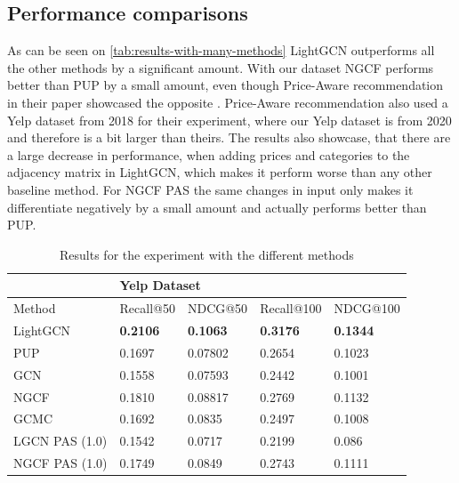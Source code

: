 \subsection{Performance comparisons}
As can be seen on \autoref{tab:results-with-many-methods} LightGCN outperforms all the other methods by a significant amount.
With our dataset NGCF performs better than PUP by a small amount, even though Price-Aware recommendation in their paper showcased the opposite \cite{Priceaware}.
Price-Aware recommendation also used a Yelp dataset from 2018 for their experiment, where our Yelp dataset is from 2020 and therefore is a bit larger than theirs.
The results also showcase, that there are a large decrease in performance, when adding prices and categories to the adjacency matrix in LightGCN, which makes it perform worse than any other baseline method.
For NGCF PAS the same changes in input only makes it differentiate negatively by a small amount and actually performs better than PUP.
\begin{table}[h!]
    \centering
    \begin{tabular}{|l|l|l|l|l|}
        \hline
        \rowcolor[HTML]{FFFFFF}
                       & \multicolumn{4}{l|}{\cellcolor[HTML]{FFFFFF}Yelp Dataset}                                                       \\ \hline
        Method         & Recall@50                                                 & NDCG@50         & Recall@100      & NDCG@100        \\ \hline
        LightGCN       & \textbf{0.2106}                                           & \textbf{0.1063} & \textbf{0.3176} & \textbf{0.1344} \\ \hline
        PUP            & 0.1697                                                    & 0.07802         & 0.2654          & 0.1023          \\ \hline
        GCN            & 0.1558                                                    & 0.07593         & 0.2442          & 0.1001          \\ \hline
        NGCF           & 0.1810                                                    & 0.08817         & 0.2769          & 0.1132          \\ \hline
        GCMC           & 0.1692                                                    & 0.0835          & 0.2497          & 0.1008          \\ \hline
        LGCN PAS (1.0) & 0.1542                                                    & 0.0717          & 0.2199          & 0.086           \\ \hline
        NGCF PAS (1.0) & 0.1749                                                    & 0.0849          & 0.2743          & 0.1111          \\ \hline
    \end{tabular}
    \caption{Results for the experiment with the different methods}
    \label{tab:results-with-many-methods}
\end{table}
